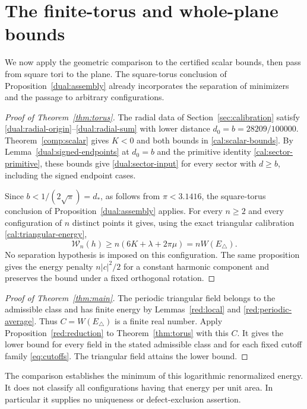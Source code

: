 \section{The finite-torus and whole-plane bounds}\label{sec:conclusion}

We now apply the geometric comparison to the certified scalar bounds,
then pass from square tori to the plane. The square-torus conclusion of
Proposition~\ref{dual:assembly} already incorporates the separation of
minimizers and the passage to arbitrary configurations.

\begin{proof}[Proof of Theorem~\ref{thm:torus}]
The radial data of Section~\ref{sec:calibration} satisfy
\eqref{dual:radial-origin}--\eqref{dual:radial-sum} with lower distance
$d_0=b=28209/100000$. Theorem~\ref{comp:scalar} gives $K<0$ and both
bounds in \eqref{cal:scalar-bounds}. By
Lemma~\ref{dual:signed-endpoints} at $d_0=b$ and the primitive identity
\eqref{cal:sector-primitive}, these bounds give
\eqref{dual:sector-input} for every sector with $d\geq b$, including
the signed endpoint cases.

Since $b<1/(2\sqrt\pi)=d_*$, as follows from $\pi<3.1416$, the
square-torus conclusion of Proposition~\ref{dual:assembly} applies.
For every $n\geq2$ and every configuration of $n$ distinct points it
gives, using the exact triangular calibration
\eqref{cal:triangular-energy},
\[
\mathcal W_n(h)\geq n(6K+\lambda+2\pi\mu)=nW(E_\triangle).
\]
No separation hypothesis is imposed on this configuration. The same
proposition gives the energy penalty $n|c|^2/2$ for a constant harmonic
component and preserves the bound under a fixed orthogonal rotation.
\end{proof}

\begin{proof}[Proof of Theorem~\ref{thm:main}]
The periodic triangular field belongs to the admissible class and has
finite energy by Lemmas~\ref{red:local} and \ref{red:periodic-average}.
Thus $C=W(E_\triangle)$ is a finite real number.  Apply
Proposition~\ref{red:reduction} to Theorem~\ref{thm:torus} with this
$C$. It gives the lower bound for every field
in the stated admissible class and for each fixed cutoff family
\eqref{eq:cutoffs}. The triangular field attains the lower bound.
\end{proof}

The comparison establishes the minimum of this logarithmic
renormalized energy. It does not classify all configurations
having that energy per unit area. In particular it supplies no
uniqueness or defect-exclusion assertion.

